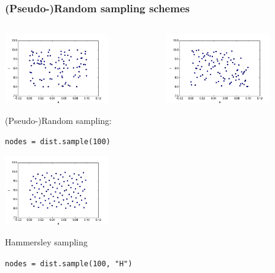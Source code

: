 \documentclass{beamer}
\begin{document}
  \begin{frame}[fragile]
 \frametitle{(Pseudo-)Random sampling schemes}
 \begin{columns}
     \begin{center}
                \includegraphics[width=0.7\textwidth]{samples.png}

                (Pseudo-)Random sampling:

                \scriptsize
                \verb;nodes = dist.sample(100);
                \normalsize
                
                \includegraphics[width=0.7\textwidth]{samples_M.png}

                Hammersley sampling

                \scriptsize
                \verb;nodes = dist.sample(100, "H");
                \normalsize
                
     \end{center}
     \begin{center}
                  \includegraphics[width=0.7\textwidth]{samples_L.png}


\end{center}
\end{columns}
\end{frame}
\end{document}
